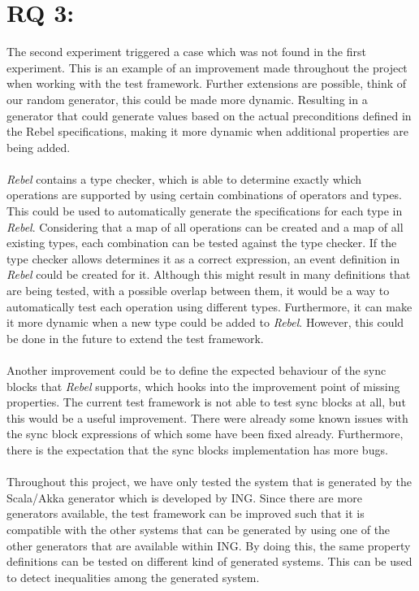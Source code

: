 \section{RQ 3: \rqThree}
The second experiment triggered a case which was not found in the first experiment. This is an example of an improvement made throughout the project when working with the test framework. Further extensions are possible, think of our random generator, this could be made more dynamic. Resulting in a generator that could generate values based on the actual preconditions defined in the Rebel specifications, making it more dynamic when additional properties are being added.\\
\\
\textit{Rebel} contains a type checker, which is able to determine exactly which operations are supported by using certain combinations of operators and types. This could be used to automatically generate the specifications for each type in \textit{Rebel}. Considering that a map of all operations can be created and a map of all existing types, each combination can be tested against the type checker. If the type checker allows determines it as a correct expression, an event definition in \textit{Rebel} could be created for it. Although this might result in many definitions that are being tested, with a possible overlap between them, it would be a way to automatically test each operation using different types. Furthermore, it can make it more dynamic when a new type could be added to \textit{Rebel}. However, this could be done in the future to extend the test framework.\\
\\
Another improvement could be to define the expected behaviour of the sync blocks that \textit{Rebel} supports, which hooks into the improvement point of missing properties. The current test framework is not able to test sync blocks at all, but this would be a useful improvement. There were already some known issues with the sync block expressions of which some have been fixed already. Furthermore, there is the expectation that the sync blocks implementation has more bugs.\\
\\
Throughout this project, we have only tested the system that is generated by the Scala/Akka generator which is developed by ING. Since there are more generators available, the test framework can be improved such that it is compatible with the other systems that can be generated by using one of the other generators that are available within ING. By doing this, the same property definitions can be tested on different kind of generated systems. This can be used to detect inequalities among the generated system.

